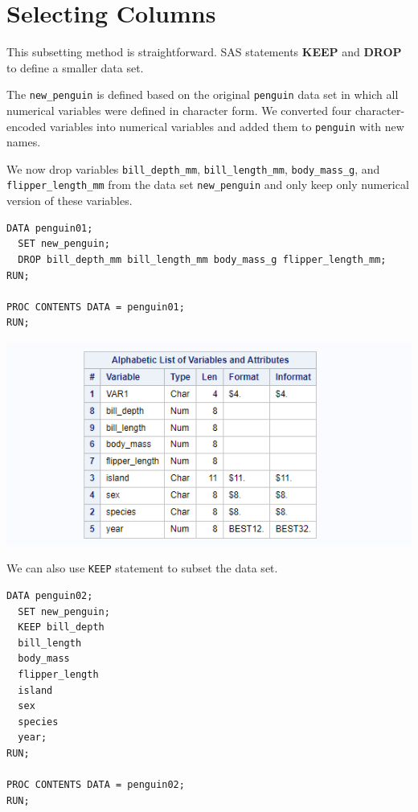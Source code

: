 \documentclass[
]{book}
\begin{document}
\hypertarget{selecting-columns}{%
\section{Selecting Columns}\label{selecting-columns}}

This subsetting method is straightforward. SAS statements \textbf{KEEP} and \textbf{DROP} to define a smaller data set.

The \texttt{new\_penguin} is defined based on the original \texttt{penguin} data set in which all numerical variables were defined in character form. We converted four character-encoded variables into numerical variables and added them to \texttt{penguin} with new names.

We now drop variables \texttt{bill\_depth\_mm}, \texttt{bill\_length\_mm}, \texttt{body\_mass\_g}, and \texttt{flipper\_length\_mm} from the data set \texttt{new\_penguin} and only keep only numerical version of these variables.

\begin{verbatim}
DATA penguin01;
  SET new_penguin;
  DROP bill_depth_mm bill_length_mm body_mass_g flipper_length_mm;
RUN;

PROC CONTENTS DATA = penguin01;
RUN;
\end{verbatim}

\begin{center}\includegraphics[width=1\linewidth]{img07/w07-penguin01Contents} \end{center}

We can also use \texttt{KEEP} statement to subset the data set.

\begin{verbatim}
DATA penguin02;
  SET new_penguin;
  KEEP bill_depth 
  bill_length 
  body_mass 
  flipper_length
  island
  sex
  species
  year;
RUN;

PROC CONTENTS DATA = penguin02;
RUN;
\end{verbatim}
\end{document}
